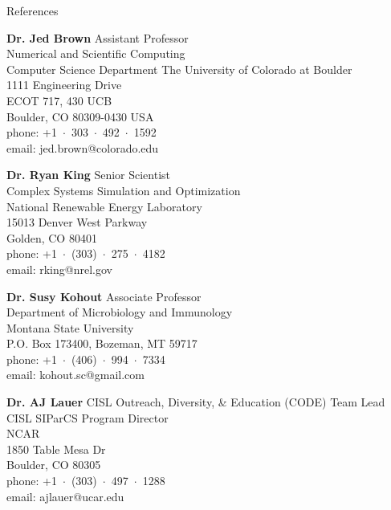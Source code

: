 \documentclass{resume} %
\begin{document}
\iftrue
\begin{rSection}{References}

\textbf{Dr. Jed Brown} \hfill Assistant Professor\\
Numerical and Scientific Computing \\
Computer Science Department
The University of Colorado at Boulder \\
1111 Engineering Drive\\
ECOT 717, 430 UCB\\
Boulder, CO 80309-0430 USA\\
phone: +1~$\cdot$~303~$\cdot$~492~$\cdot$~1592 \\
email: jed.brown@colorado.edu

\textbf{Dr. Ryan King} \hfill Senior Scientist\\
Complex Systems Simulation and Optimization \\
National Renewable Energy Laboratory \\
15013 Denver West Parkway\\
Golden, CO 80401\\
phone: +1~$\cdot$~(303)~$\cdot$~275~$\cdot$~4182\\
email: rking@nrel.gov

\textbf{Dr. Susy Kohout} \hfill Associate Professor\\
Department of Microbiology and Immunology\\
Montana State University\\
P.O. Box 173400, Bozeman, MT 59717\\
phone: +1~$\cdot$~(406)~$\cdot$~994~$\cdot$~7334\\
email: kohout.sc@gmail.com

\textbf{Dr. AJ Lauer} \hfill CISL Outreach, Diversity, \& Education (CODE) Team Lead\\
CISL \hfill SIParCS Program Director \\
NCAR\\
1850 Table Mesa Dr \\
Boulder, CO 80305\\
phone: +1~$\cdot$~(303)~$\cdot$~497~$\cdot$~1288\\
email: ajlauer@ucar.edu
\end{rSection}
\fi
\iffalse
\begin{rSection}{Interests}
Cycling\hspace{1cm}Skiing\hspace{1cm}Trail and Ultra running\hspace{1cm}Ballet\hspace{1cm}Climbing
\end{rSection}
\fi
\end{document}
